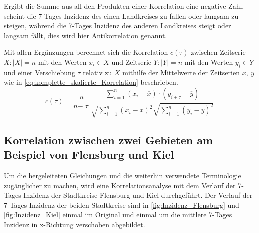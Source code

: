 Ergibt die Summe aus all den Produkten einer Korrelation eine negative Zahl, scheint die 7-Tages Inzidenz des einen Landkreises zu fallen oder langsam zu steigen, während die 7-Tages Inzidenz des anderen Landkreises steigt oder langsam fällt, dies wird hier Antikorrelation genannt.

Mit allen Ergänzungen berechnet sich die Korrelation $c(\tau)$ zwischen Zeitserie $X:|X|=n$ mit den Werten $x_i\in X$ und Zeitserie $Y:|Y|=n$ mit den Werten $y_i \in Y$ und einer Verschiebung $\tau$ relativ zu $X$ mithilfe der Mittelwerte der Zeitserien $\overline x,\ \overline y$ wie in \autoref{eq:komplette_skalierte_Korrelation} beschrieben.
\begin{equation}\label{eq:komplette_skalierte_Korrelation}
    c(\tau) =\frac{n}{n-\vert\tau\vert}
    \frac{\sum_{i=1}^n (x_i-\overline x)\cdot (y_{i+\tau}-\overline y)}{\sqrt{\sum_{i=1}^n (x_i-\overline x)^2}\sqrt{\sum_{i=1}^n (y_i-\overline y)^2}}
\end{equation}

\subsection{Korrelation zwischen zwei Gebieten am Beispiel von Flensburg und Kiel}
Um die hergeleiteten Gleichungen und die weiterhin verwendete Terminologie zugänglicher zu machen, wird eine Korrelationsanalyse mit dem Verlauf der 7-Tages Inzidenz der Stadtkreise Flensburg und Kiel durchgeführt. Der Verlauf der 7-Tages Inzidenz der beiden Stadtkreise sind in \autoref{fig:Inzidenz_Flensburg} und \autoref{fig:Inzidenz_Kiel} einmal im Original und einmal um die mittlere 7-Tages Inzidenz in x-Richtung verschoben abgebildet.

